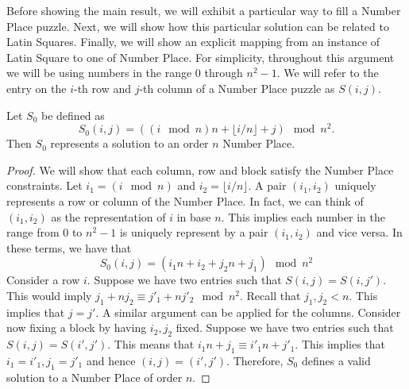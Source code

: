 \documentclass[runningheads,a4paper]{llncs}
\begin{document}
Before showing the main result, we will exhibit a particular way to fill a Number Place puzzle. Next, we will show how this particular solution can be related to Latin Squares. Finally, we will show an explicit mapping from an instance of Latin Square to one of Number Place. For simplicity, throughout this argument we will be using numbers in the range $0$ through $n^2 - 1$. We will refer to the entry on the $i$-th row and $j$-th column of a Number Place puzzle as $S(i,j)$.

\begin{proposition}
Let $S_0$ be defined as
$$S_0 (i,j) = ((i \mod n) n + \lfloor i/n \rfloor + j) \mod n^2. $$
Then $S_0$ represents a solution to an order $n$ Number Place.
\end{proposition}

\begin{proof}
We will show that each column, row and block satisfy the Number Place constraints. Let $i_1 = (i \mod n)$ and $i_2 = \lfloor i/n \rfloor$. A pair $(i_1, i_2)$ uniquely represents a row or column of the Number Place. In fact, we can think of $(i_1, i_2)$ as the representation of $i$ in base $n$. This implies each number in the range from $0$ to $n^2 -1$ is uniquely represent by a pair $(i_1, i_2)$ and vice versa. In these terms, we have that
$$ S_0 (i, j) = (i_1 n + i_2 + j_2 n + j_1) \mod n^2 $$
Consider a row $i$. Suppose we have two entries such that $S(i,j) = S(i, j')$. This would imply $j_1 + n j_2 \equiv j'_1 + n j'_2 \mod n^2$. Recall that $j_1, j_2 < n$. This implies that $j = j'$. A similar argument can be applied for the columns. Consider now fixing a block by having $i_2, j_2$ fixed. Suppose we have two entries such that $S(i,j)=S(i',j')$. This means that $i_1 n + j_1 \equiv i'_1 n + j'_1$. This implies that $i_1 = i'_1, j_1 = j'_1$ and hence $(i,j) = (i', j')$. Therefore, $S_0$ defines a valid solution to a Number Place of order $n$.
\end{proof}
\end{document}
